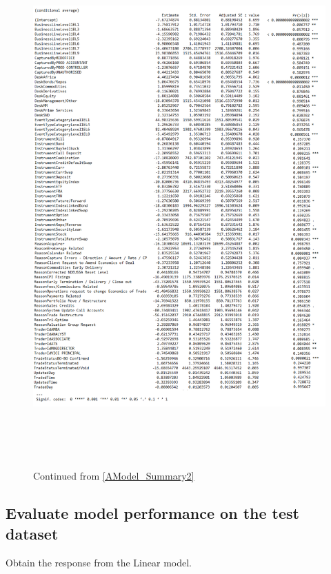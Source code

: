 \documentclass[
]{article}
\begin{document}
\begin{figure}
\centering
\includegraphics[height=20cm, width=15cm]{Get_models_bin3.pdf}
\caption[Model averaging]{Continued from \ref{AModel_Summary2}}
\label{Poisson GLM Amodel summary statistics continued}
\end{figure}

\subsection{Evaluate model performance on the test dataset}
\label{sec:Evaluate model performance on the test dataset}

Obtain the response from the Linear model.

\small
\end{document}
